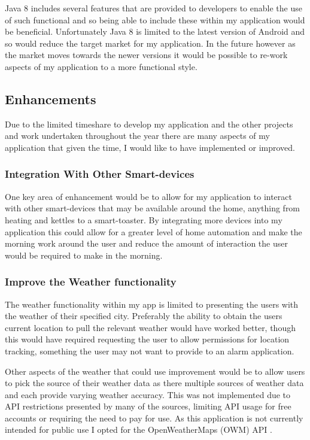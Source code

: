 Java 8 includes several features that are provided to developers to
enable the use of such functional and so being able to include these
within my application would be beneficial. Unfortunately Java 8 is
limited to the latest version of Android and so would reduce the target
market for my application. In the future however as the market moves
towards the newer versions it would be possible to re-work aspects of my
application to a more functional style.

\subsection{Enhancements}\label{enhancements}

Due to the limited timeshare to develop my application and the other
projects and work undertaken throughout the year there are many aspects
of my application that given the time, I would like to have implemented
or improved.

\subsubsection{Integration With Other
Smart-devices}\label{integration-with-other-smart-devices}

One key area of enhancement would be to allow for my application to
interact with other smart-devices that may be available around the home,
anything from heating and kettles to a smart-toaster. By integrating
more devices into my application this could allow for a greater level of
home automation and make the morning work around the user and reduce the
amount of interaction the user would be required to make in the morning.

\subsubsection{Improve the Weather
functionality}\label{improve-the-weather-functionality}

The weather functionality within my app is limited to presenting the
users with the weather of their specified city. Preferably the ability
to obtain the users current location to pull the relevant weather would
have worked better, though this would have required requesting the user
to allow permissions for location tracking, something the user may not
want to provide to an alarm application.

Other aspects of the weather that could use improvement would be to
allow users to pick the source of their weather data as there multiple
sources of weather data and each provide varying weather accuracy. This
was not implemented due to API restrictions presented by many of the
sources, limiting API usage for free accounts or requiring the need to
pay for use. As this application is not currently intended for public
use I opted for the OpenWeatherMaps (OWM) API
\parencite{openweathermap}.


